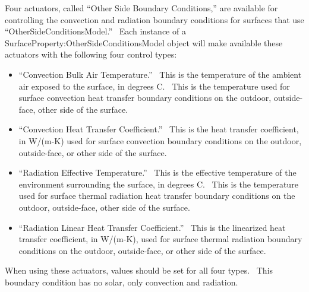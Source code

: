 Four actuators, called ``Other Side Boundary Conditions,'' are available for controlling the convection and radiation boundary conditions for surfaces that use ``OtherSideConditionsModel.''~ Each instance of a SurfaceProperty:OtherSideConditionsModel object will make available these actuators with the following four control types:

\begin{itemize}
\item
  ``Convection Bulk Air Temperature.''~ This is the temperature of the ambient air exposed to the surface, in degrees C.~ This is the temperature used for surface convection heat transfer boundary conditions on the outdoor, outside-face, other side of the surface.
\item
  ``Convection Heat Transfer Coefficient.''~ This is the heat transfer coefficient, in W/(m-K) used for surface convection boundary conditions on the outdoor, outside-face, or other side of the surface.
\item
  ``Radiation Effective Temperature.''~ This is the effective temperature of the environment surrounding the surface, in degrees C.~ This is the temperature used for surface thermal radiation heat transfer boundary conditions on the outdoor, outside-face, other side of the surface.
\item
  ``Radiation Linear Heat Transfer Coefficient.''~ This is the linearized heat transfer coefficient, in W/(m-K), used for surface thermal radiation boundary conditions on the outdoor, outside-face, or other side of the surface.
\end{itemize}

When using these actuators, values should be set for all four types.~ This boundary condition has no solar, only convection and radiation.
